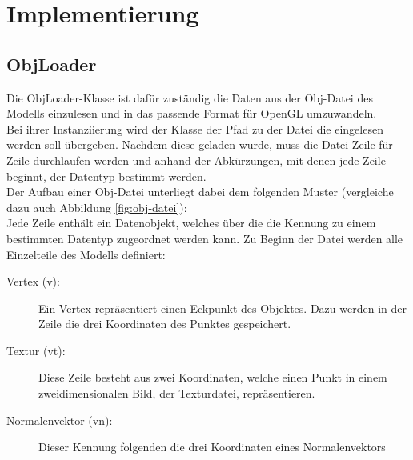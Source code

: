 \chapter{Implementierung}\label{chapter:Implementierung}

\section{ObjLoader}
Die ObjLoader-Klasse ist dafür zuständig die Daten aus der Obj-Datei des Modells einzulesen und in das passende Format für OpenGL umzuwandeln.\\
Bei ihrer Instanziierung wird der Klasse der Pfad zu der Datei die eingelesen werden soll übergeben.
Nachdem diese geladen wurde, muss die Datei Zeile für Zeile durchlaufen werden und anhand der Abkürzungen, mit denen jede Zeile beginnt, der Datentyp bestimmt werden. \\
Der Aufbau einer Obj-Datei unterliegt dabei dem folgenden Muster (vergleiche dazu auch Abbildung \ref{fig:obj-datei}):\\
Jede Zeile enthält ein Datenobjekt, welches über die die Kennung zu einem bestimmten Datentyp zugeordnet werden kann. 
Zu Beginn der Datei werden alle Einzelteile des Modells definiert:
\begin{description}
\item[Vertex (v):] Ein Vertex repräsentiert einen Eckpunkt des Objektes. Dazu werden in der Zeile die drei Koordinaten des Punktes gespeichert.
\item[Textur (vt):] Diese Zeile besteht aus zwei Koordinaten, welche einen Punkt in einem zweidimensionalen Bild, der Texturdatei, repräsentieren.
\item[Normalenvektor (vn):] Dieser Kennung folgenden die drei Koordinaten eines Normalenvektors  
\end{description}

